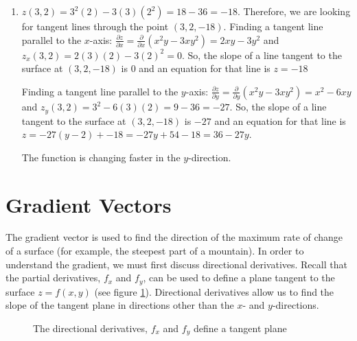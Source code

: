 \begin{Answer}[ref = tangent]
\begin{enumerate}
    The function is changing faster in the $y$-direction.

    \item $z(3, 2) = 3^2(2) - 3(3)(2^2) = 18 - 36 = -18$. Therefore, we are 
    looking for tangent lines through the point $(3, 2, -18)$. Finding a 
    tangent line parallel to the $x$-axis: $\frac{\partial z}{\partial x} = 
    \frac{\partial}{\partial x} \left( x^2y - 3xy^2 \right) = 2xy - 3y^2$ and 
    $z_x(3, 2) = 2(3)(2) - 3(2)^2 = 0$. So, the slope of a line tangent to the 
    surface at $(3, 2, -18)$ is $0$ and an equation for that line is $z = -18$

    Finding a tangent line parallel to the $y$-axis: $\frac{\partial z}{
    \partial y} = \frac{\partial}{\partial y} \left( x^2y - 3xy^2 \right) = 
    x^2 - 6xy$ and $z_y(3, 2) = 3^2 - 6(3)(2) = 9 - 36 = -27$. So, the slope of 
    a line tangent to the surface at $(3, 2, -18)$ is $-27$ and an equation for
    that line is $z = -27(y - 2) + -18 = -27y + 54 - 18 = 36 - 27y$.

    The function is changing faster in the $y$-direction. 
\end{enumerate}
\end{Answer}

\section{Gradient Vectors}
The gradient vector is used to find the direction of the maximum rate of change 
of a surface (for example, the steepest part of a mountain). In order to 
understand the gradient, we must first discuss directional derivatives. Recall 
that the partial derivatives, $f_x$ and $f_y$, can be used to define a plane 
tangent to the surface $z = f(x,y)$ (see figure \ref{fig:plane}). Directional 
derivatives allow us to find the slope of the tangent plane in directions 
other than the $x$- and $y$-directions. 

\begin{figure}[H]
    \centering
    \caption{The directional derivatives, $f_x$ and $f_y$ define a tangent 
    plane}
    \label{fig:plane}
\end{figure}

